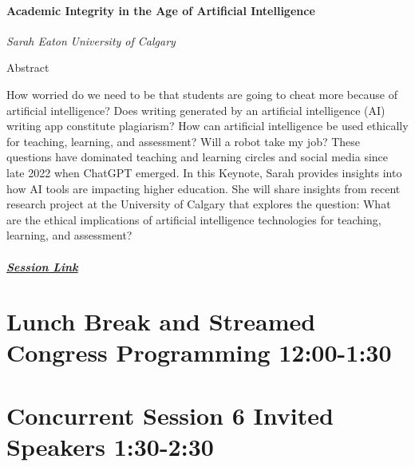 \documentclass[
]{book}
\begin{document}
\begin{keynote}
\hypertarget{academic-integrity-in-the-age-of-artificial-intelligence}{%
\paragraph*{Academic Integrity in the Age of Artificial
Intelligence}\label{academic-integrity-in-the-age-of-artificial-intelligence}}

\emph{Sarah Eaton} \emph{University of Calgary}

Abstract

How worried do we need to be that students are going to cheat more
because of artificial intelligence? Does writing generated by an
artificial intelligence (AI) writing app constitute plagiarism? How can
artificial intelligence be used ethically for teaching, learning, and
assessment? Will a robot take my job? These questions have dominated
teaching and learning circles and social media since late 2022 when
ChatGPT emerged. In this Keynote, Sarah provides insights into how AI
tools are impacting higher education. She will share insights from
recent research project at the University of Calgary that explores the
question: What are the ethical implications of artificial intelligence
technologies for teaching, learning, and assessment?

\hypertarget{session-link}{%
\subparagraph*{\texorpdfstring{\href{}{Session
Link}}{Session Link}}\label{session-link}}
\end{keynote}

\hypertarget{lunch-break-and-streamed-congress-programming-1200-130}{%
\section*{Lunch Break and Streamed Congress Programming \textbar{} 12:00-1:30}\label{lunch-break-and-streamed-congress-programming-1200-130}}

\hypertarget{concurrent-session-6-invited-speakers-130-230}{%
\section*{Concurrent Session 6 \textbar{} Invited Speakers \textbar{} 1:30-2:30}\label{concurrent-session-6-invited-speakers-130-230}}
\end{document}
